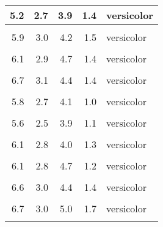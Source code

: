 \documentclass[
]{article}
\begin{document}
\begin{table}
\begin{tabular}[t]{r|r|r|r|l}
\hline
5.2 & 2.7 & 3.9 & 1.4 & versicolor\\
\hline
\cellcolor{gray!6}{5.0} & \cellcolor{gray!6}{2.0} & \cellcolor{gray!6}{3.5} & \cellcolor{gray!6}{1.0} & \cellcolor{gray!6}{versicolor}\\
\hline
5.9 & 3.0 & 4.2 & 1.5 & versicolor\\
\hline
\cellcolor{gray!6}{6.0} & \cellcolor{gray!6}{2.2} & \cellcolor{gray!6}{4.0} & \cellcolor{gray!6}{1.0} & \cellcolor{gray!6}{versicolor}\\
\hline
6.1 & 2.9 & 4.7 & 1.4 & versicolor\\
\hline
\cellcolor{gray!6}{5.6} & \cellcolor{gray!6}{2.9} & \cellcolor{gray!6}{3.6} & \cellcolor{gray!6}{1.3} & \cellcolor{gray!6}{versicolor}\\
\hline
6.7 & 3.1 & 4.4 & 1.4 & versicolor\\
\hline
\cellcolor{gray!6}{5.6} & \cellcolor{gray!6}{3.0} & \cellcolor{gray!6}{4.5} & \cellcolor{gray!6}{1.5} & \cellcolor{gray!6}{versicolor}\\
\hline
5.8 & 2.7 & 4.1 & 1.0 & versicolor\\
\hline
\cellcolor{gray!6}{6.2} & \cellcolor{gray!6}{2.2} & \cellcolor{gray!6}{4.5} & \cellcolor{gray!6}{1.5} & \cellcolor{gray!6}{versicolor}\\
\hline
5.6 & 2.5 & 3.9 & 1.1 & versicolor\\
\hline
\cellcolor{gray!6}{5.9} & \cellcolor{gray!6}{3.2} & \cellcolor{gray!6}{4.8} & \cellcolor{gray!6}{1.8} & \cellcolor{gray!6}{versicolor}\\
\hline
6.1 & 2.8 & 4.0 & 1.3 & versicolor\\
\hline
\cellcolor{gray!6}{6.3} & \cellcolor{gray!6}{2.5} & \cellcolor{gray!6}{4.9} & \cellcolor{gray!6}{1.5} & \cellcolor{gray!6}{versicolor}\\
\hline
6.1 & 2.8 & 4.7 & 1.2 & versicolor\\
\hline
\cellcolor{gray!6}{6.4} & \cellcolor{gray!6}{2.9} & \cellcolor{gray!6}{4.3} & \cellcolor{gray!6}{1.3} & \cellcolor{gray!6}{versicolor}\\
\hline
6.6 & 3.0 & 4.4 & 1.4 & versicolor\\
\hline
\cellcolor{gray!6}{6.8} & \cellcolor{gray!6}{2.8} & \cellcolor{gray!6}{4.8} & \cellcolor{gray!6}{1.4} & \cellcolor{gray!6}{versicolor}\\
\hline
6.7 & 3.0 & 5.0 & 1.7 & versicolor\\
\hline
\cellcolor{gray!6}{6.0} & \cellcolor{gray!6}{2.9} & \cellcolor{gray!6}{4.5} & \cellcolor{gray!6}{1.5} & \cellcolor{gray!6}{versicolor}\\

\end{tabular}
\end{table}
\end{document}
